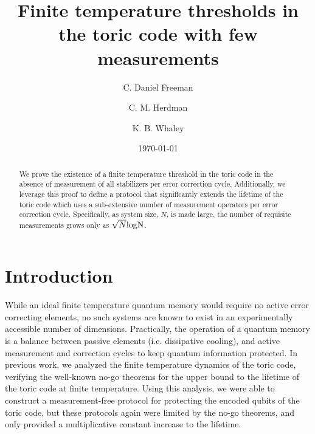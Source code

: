 \documentclass[twocolumn,superscriptaddress,aps,prb,floatfix]{revtex4-1}
\begin{document}

\title{Finite temperature thresholds in the toric code with few measurements}


\author{C. Daniel Freeman}

\author{C. M. Herdman}

\author{K. B. Whaley}

\date{\today}

\begin{abstract}
 We prove the existence of a finite temperature threshold in the toric code in the absence of measurement of all stabilizers per error correction cycle.  Additionally, we leverage this proof to define a protocol that significantly extends the lifetime of the toric code which uses a sub-extensive number of measurement operators per error correction cycle.  Specifically, as system size, $N$, is made large, the number of requisite measurements grows only as $\sqrt{N} \rm{log}N$.   
\end{abstract}

\maketitle


\section{Introduction}
\label{sec:Intro}

 While an ideal finite temperature quantum memory would require no active error correcting elements, no such systems are known to exist in an experimentally accessible number of dimensions.  Practically, the operation of a quantum memory is a balance between passive elements (i.e. dissipative cooling), and active measurement and correction cycles to keep quantum information protected.  In previous work, we analyzed the finite temperature dynamics of the toric code, verifying the well-known no-go theorems for the upper bound to the lifetime of the toric code at finite temperature.  Using this analysis, we were able to construct a measurement-free protocol for protecting the encoded qubits of the toric code, but these protocols again were limited by the no-go theorems, and only provided a multiplicative constant increase to the lifetime.  
 
\end{document}
